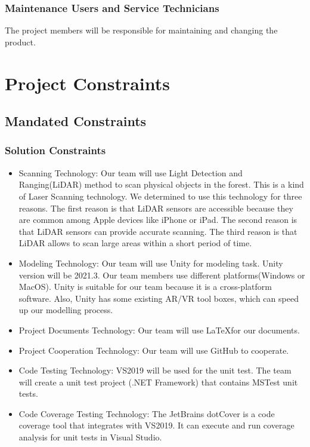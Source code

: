 \documentclass{article}
\begin{document}
\subsubsection{Maintenance Users and Service Technicians}
The project members will be responsible for maintaining and changing the product.


\section{Project Constraints}
\subsection{Mandated Constraints}
\subsubsection{Solution Constraints}
\begin{itemize}
    \item Scanning Technology: Our team will use Light Detection and Ranging(LiDAR) method
    to scan physical objects in the forest. This is a kind of Laser Scanning technology. 
    We determined to use this technology for three reasons. The first reason is that LiDAR sensors
    are accessible because they are common among Apple devices like iPhone or iPad. The 
    second reason is that LiDAR sensors can provide accurate scanning. The third reason
    is that LiDAR allows to scan large areas within a short period of time.
    \item Modeling Technology: Our team will use Unity for modeling task. Unity version 
    will be 2021.3. Our team members use different platforms(Windows or MacOS). Unity is 
    suitable for our team because it is a cross-platform software. Also, Unity has some 
    existing AR/VR tool boxes, which can speed up our modelling process.
    \item Project Documents Technology: Our team will use \LaTeX for our documents.
    \item Project Cooperation Technology: Our team will use GitHub to cooperate.
    \item Code Testing Technology: VS2019 will be used for the unit test. The team will create a unit test project (.NET Framework) that contains MSTest unit tests.
    \item Code Coverage Testing Technology: The JetBrains dotCover is a code coverage tool that integrates with VS2019. It can execute and run coverage analysis for unit tests in Visual Studio.
\end{itemize}
\end{document}
